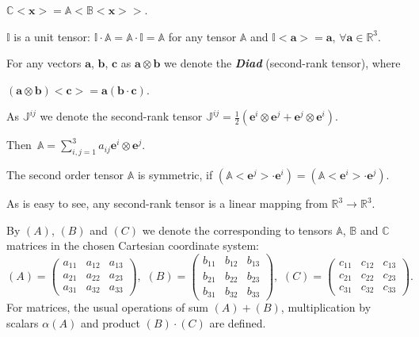 \documentclass{article}
\theoremstyle{plain}
\theoremstyle{definition}
\numberwithin{equation}{section}
\begin{document}
$\mathbb{C}<\boldsymbol{x}>=\mathbb{A}<\mathbb{B}<\boldsymbol{x}>>$.

$\mathbb{I}$ is a unit tensor: $\mathbb{I}\cdot\mathbb{A}=\mathbb{A}\cdot\mathbb{I}=\mathbb{A}$ for any tensor $\mathbb{A}$ and $\mathbb{I}<\boldsymbol{a}>=\boldsymbol{a},\,\forall\boldsymbol{a}\in\mathbb{R}^{3}$.

For any vectors $\boldsymbol{a}$, $\boldsymbol{b}$, $\boldsymbol{c}$ as $\boldsymbol{a}\otimes\boldsymbol{b}$ we denote the \textbf{\emph{Diad}} (second-rank tensor), where 

$(\boldsymbol{a}\otimes\boldsymbol{b})<\boldsymbol{c}>=
\boldsymbol{a}(\boldsymbol{b}\cdot\boldsymbol{c})$.

As $\mathbb{J}^{ij}$ we denote the second-rank tensor $\mathbb{J}^{ij}=\frac{1}{2}
(\boldsymbol{e}^{i}\otimes\boldsymbol{e}^{j}+\boldsymbol{e}^{j}\otimes\boldsymbol{e}^{i})$.

Then $\displaystyle\,\mathbb{A}=\sum_{i,j=1}^{3}{a}_{ij}\boldsymbol{e}^{i}\otimes\boldsymbol{e}^{j}$.

The second order tensor $\mathbb{A}$ is symmetric, if
$(\mathbb{A}<\boldsymbol{e}^{j}>\cdot\boldsymbol{e}^{i})=
(\mathbb{A}<\boldsymbol{e}^{i}>\cdot\boldsymbol{e}^{j})$.

As is easy to see, any second-rank tensor is a linear mapping from $\mathbb{R}^{3}\rightarrow\mathbb{R}^{3}$.

By $(A)$, $(B)$ and $(C)$ we denote the corresponding to tensors $\mathbb{A}$, $\mathbb{B}$ and $\mathbb{C}$ matrices in the chosen Cartesian coordinate system:
\begin{equation*}
(A)=\left(
\begin{array}{ccc}
a_{11}&a_{12}&a_{13}\\
a_{21}&a_{22}&a_{23}\\
a_{31}&a_{32}&a_{33}
\end{array}
\right),\,\,(B)=
\left(
\begin{array}{ccc}
b_{11}&b_{12}&b_{13}\\
b_{21}&b_{22}&b_{23}\\
b_{31}&b_{32}&b_{33}
\end{array}
\right),\,\,(C)=
\left(
\begin{array}{ccc}
c_{11}&c_{12}&c_{13}\\
c_{21}&c_{22}&c_{23}\\
c_{31}&c_{32}&c_{33}
\end{array}
\right).
\end{equation*}
For matrices, the usual operations of sum $(A)+(B)$, multiplication by scalars $\alpha(A)$ and product $(B)\cdot(C)$ are defined.
\end{document}
